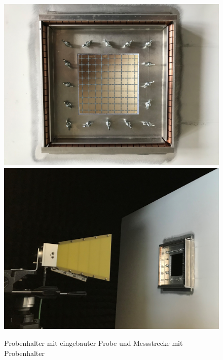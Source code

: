 \begin{figure}[ht]
    \centering
    \includegraphics[height=.2\textheight, draft = false]{Kapitel/Kapitel4/Probenhalter.jpg}
    \hspace{1cm}
    \includegraphics[height=.2\textheight, draft = false]{Abbildungen/Kapitel4/IMG_5675_trimmed.jpg}
    \caption{Probenhalter mit eingebauter Probe und Messstrecke mit Probenhalter}
    \label{fig:4_Probenhalter_mit_Probe}
\end{figure}



